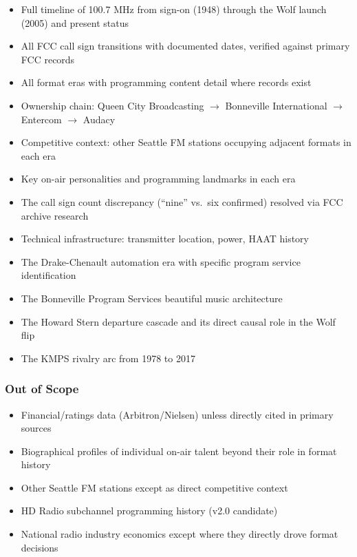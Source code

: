 \documentclass[11pt,letterpaper]{article}
\begin{document}
\begin{itemize}[leftmargin=2em]
  \item Full timeline of 100.7 MHz from sign-on (1948) through the Wolf launch (2005) and present status
  \item All FCC call sign transitions with documented dates, verified against primary FCC records
  \item All format eras with programming content detail where records exist
  \item Ownership chain: Queen City Broadcasting $\rightarrow$ Bonneville International $\rightarrow$ Entercom $\rightarrow$ Audacy
  \item Competitive context: other Seattle FM stations occupying adjacent formats in each era
  \item Key on-air personalities and programming landmarks in each era
  \item The call sign count discrepancy (``nine'' vs.\ six confirmed) resolved via FCC archive research
  \item Technical infrastructure: transmitter location, power, HAAT history
  \item The Drake-Chenault automation era with specific program service identification
  \item The Bonneville Program Services beautiful music architecture
  \item The Howard Stern departure cascade and its direct causal role in the Wolf flip
  \item The KMPS rivalry arc from 1978 to 2017
\end{itemize}

\subsubsection{Out of Scope}

\begin{itemize}[leftmargin=2em]
  \item Financial/ratings data (Arbitron/Nielsen) unless directly cited in primary sources
  \item Biographical profiles of individual on-air talent beyond their role in format history
  \item Other Seattle FM stations except as direct competitive context
  \item HD Radio subchannel programming history (v2.0 candidate)
  \item National radio industry economics except where they directly drove format decisions
\end{itemize}
\end{document}
